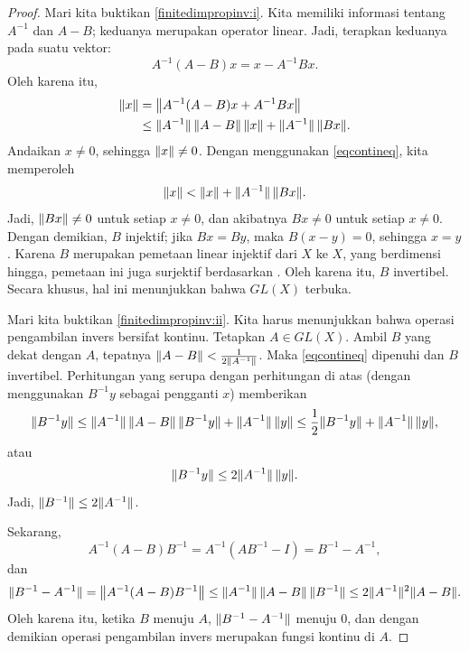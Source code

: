 \begin{proof}
Mari kita buktikan \ref{finitedimpropinv:i}.   Kita memiliki informasi tentang $A^{-1}$
dan $A-B$; keduanya merupakan operator linear.
Jadi, terapkan keduanya pada suatu vektor:
\begin{equation*}
A^{-1}(A-B)x
=
x-A^{-1}Bx .
\end{equation*}
Oleh karena itu,
\begin{equation*}
\begin{split}
\lVert {x} \rVert 
& =
\bigl\lVert {A^{-1} (A-B)x + A^{-1}Bx} \bigr\rVert
\\
& \leq
\lVert {A^{-1}} \rVert\,\lVert {A-B} \rVert\, \lVert {x} \rVert + \lVert {A^{-1}} \rVert\,\lVert {Bx} \rVert .
\end{split}
\end{equation*}
Andaikan $x \neq 0$, sehingga $\lVert {x} \rVert \neq 0$.
Dengan menggunakan \eqref{eqcontineq}, kita memperoleh
\begin{equation*}
\lVert {x} \rVert < \lVert {x} \rVert + \lVert {A^{-1}} \rVert \, \lVert {Bx} \rVert .
\end{equation*}
Jadi, $\lVert {Bx} \rVert \neq 0$ untuk setiap $x \neq 0$, dan akibatnya
$Bx \neq 0$ untuk setiap $x \neq 0$.  Dengan demikian,
$B$ injektif; jika $Bx = By$, maka $B(x-y) = 0$, sehingga $x=y$.
Karena $B$ merupakan pemetaan linear injektif dari $X$ ke $X$, yang berdimensi hingga,
pemetaan ini juga surjektif berdasarkan .
Oleh karena itu, $B$ invertibel.
Secara khusus, hal ini menunjukkan bahwa $GL(X)$ terbuka.

Mari kita buktikan \ref{finitedimpropinv:ii}.
Kita harus menunjukkan bahwa operasi pengambilan invers bersifat kontinu.
Tetapkan $A \in GL(X)$.  Ambil $B$ yang dekat dengan $A$,
tepatnya $\lVert {A-B} \rVert < \frac{1}{2 \lVert {A^{-1}} \rVert}$.
Maka \eqref{eqcontineq} dipenuhi dan $B$ invertibel.
Perhitungan yang serupa dengan perhitungan di atas (dengan menggunakan $B^{-1}y$ sebagai pengganti $x$) memberikan
\begin{equation*}
\lVert {B^{-1}y} \rVert \leq 
\lVert {A^{-1}} \rVert \, \lVert {A-B} \rVert \,  \lVert {B^{-1}y} \rVert + \lVert {A^{-1}} \rVert \, \lVert {y} \rVert
\leq
\frac{1}{2} \lVert {B^{-1}y} \rVert + \lVert {A^{-1}} \rVert\,\lVert {y} \rVert ,
\end{equation*}
atau
\begin{equation*}
\lVert {B^{-1}y} \rVert \leq 
2\lVert {A^{-1}} \rVert\,\lVert {y} \rVert .
\end{equation*}
Jadi,
$
\lVert {B^{-1}} \rVert \leq 2 \lVert {A^{-1}} \rVert
$.

Sekarang,
\begin{equation*}
A^{-1}(A-B)B^{-1} = 
A^{-1}(AB^{-1}-I) = 
B^{-1}-A^{-1} ,
\end{equation*}
dan
\begin{equation*}
\lVert {B^{-1}-A^{-1}} \rVert =
\bigl\lVert {A^{-1}(A-B)B^{-1}} \bigr\rVert \leq
\lVert {A^{-1}} \rVert\,\lVert {A-B} \rVert\,\lVert {B^{-1}} \rVert
\leq
2\lVert {A^{-1}} \rVert^2
\lVert {A-B} \rVert .
\end{equation*}
Oleh karena itu, ketika $B$ menuju $A$, $\lVert {B^{-1}-A^{-1}} \rVert$ menuju 0, dan
dengan demikian operasi pengambilan invers merupakan fungsi kontinu di $A$.
\end{proof}

